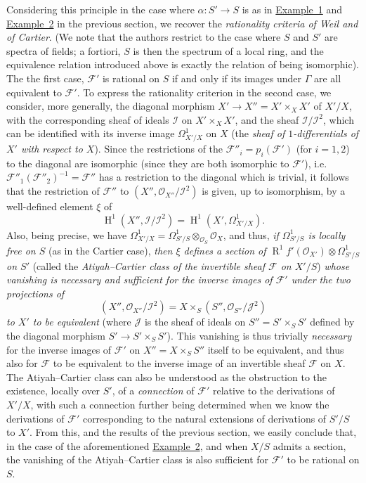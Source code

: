 \documentclass{article}
\newcommand{\scr}[1]{{\mathscr{#1}}}
\renewcommand{\cal}[1]{{\mathcal{#1}}}
\DeclareMathOperator{\HH}{H}
\DeclareMathOperator{\RR}{R}
\newcommand{\oldpage}[1]{\marginpar{\footnotesize$\Big\vert$ \textit{p.~#1}}}
\begin{document}
Considering this principle in the case where $\alpha\colon S'\to S$ is as in \hyperref[example:B.3(1)]{Example~1} and \hyperref[example:B.3(2)]{Example~2} in the previous section, we recover the \emph{rationality criteria of Weil and of Cartier}.
(We note that the authors restrict to the case where $S$ and $S'$
\oldpage{190-25}
are spectra of fields;
a fortiori, $S$ is then the spectrum of a local ring, and the equivalence relation introduced above is exactly the relation of being isomorphic).
The the first case, $\cal{F}'$ is rational on $S$ if and only if its images under $\Gamma$ are all equivalent to $\cal{F}'$.
To express the rationality criterion in the second case, we consider, more generally, the diagonal morphism $X'\to X''=X'\times_X X'$ of $X'/X$, with the corresponding sheaf of ideals $\scr{I}$ on $X'\times_X X'$, and the sheaf $\scr{I}/\scr{I}^2$, which can be identified with its inverse image $\Omega_{X'/X}^1$ on $X$ (the \emph{sheaf of $1$-differentials of $X'$ with respect to $X$}).
Since the restrictions of the $\cal{F}''_i=p_i(\cal{F}')$ (for $i=1,2$) to the diagonal are isomorphic (since they are both isomorphic to $\cal{F}'$), i.e. $\cal{F}''_1(\cal{F}''_2)^{-1}=\cal{F}''$ has a restriction to the diagonal which is trivial, it follows that the restriction of $\cal{F}''$ to $(X'',\scr{O}_{X''}/\scr{I}^2)$ is given, up to isomorphism, by a well-defined element $\xi$ of
\[
  \HH^1(X'',\scr{I}/\scr{I}^2) = \HH^1(X',\Omega_{X'/X}^1).
\]
Also, being precise, we have $\Omega_{X'/X}^1=\Omega_{S'/S}^1\otimes_{\scr{O}_S}\scr{O}_X$, and thus, \emph{if $\Omega_{S'/S}^1$ is locally free on $S$} (as in the Cartier case), \emph{then $\xi$ defines a section of $\RR^1f'(\scr{O}_{X'})\otimes\Omega_{S'/S}^1$ on $S'$} (called the \emph{Atiyah--Cartier class of the invertible sheaf $\cal{F}$ on $X'/S$}) \emph{whose vanishing is necessary and sufficient for the inverse images of $\cal{F}'$ under the two projections of}
\[
  (X'',\scr{O}_{X''}/\scr{I}^2) = X\times_S(S'',\scr{O}_{S''}/\scr{J}^2)
\]
\emph{to $X'$ to be equivalent} (where $\scr{J}$ is the sheaf of ideals on $S''=S'\times_S S'$ defined by the diagonal morphism $S'\to S'\times_S S'$).
This vanishing is thus trivially \emph{necessary} for the inverse images of $\cal{F}'$ on $X''=X\times_S S''$ itself to be equivalent, and thus also for $\cal{F}$ to be equivalent to the inverse image of an invertible sheaf $\cal{F}$ on $X$.
The Atiyah--Cartier class can also be understood as the obstruction to the existence, locally over $S'$, of a \emph{connection} of $\cal{F}'$ relative to the derivations of $X'/X$, with such a connection further being determined when we know the derivations of $\cal{F}'$ corresponding to the natural extensions of derivations of $S'/S$ to $X'$.
From this, and the results of the previous section, we easily conclude that, in the case of the aforementioned \hyperref[example:B.3(2)]{Example~2}, and when $X/S$ admits a section, the vanishing of the Atiyah--Cartier class is also sufficient for $\cal{F}'$ to be rational on $S$.
\end{document}
